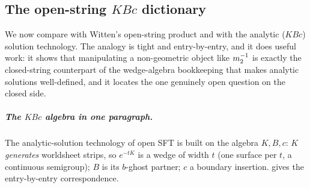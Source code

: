\subsection{The open-string \texorpdfstring{$KBc$}{KBc} dictionary}
\label{rs:sec:osft}

We now compare with Witten's open-string product and with the analytic
($KBc$) solution technology. The analogy is tight and entry-by-entry, and it does
useful work: it shows that manipulating a non-geometric object like $m_2^{-1}$
is exactly the closed-string counterpart of the wedge-algebra bookkeeping that
makes analytic solutions well-defined, and it locates the one genuinely open
question on the closed side.

\subparagraph{The $KBc$ algebra in one paragraph.} The analytic-solution technology
of open SFT \cite{Schnabl2005,ErlerSchnabl2009,Erler2019} is built on the algebra
$K,B,c$: $K$ \emph{generates} worldsheet strips, so $e^{-tK}$ is a wedge of width
$t$ (one surface per $t$, a continuous semigroup); $B$ is its $b$-ghost partner;
$c$ a boundary insertion.  gives the entry-by-entry
correspondence.

